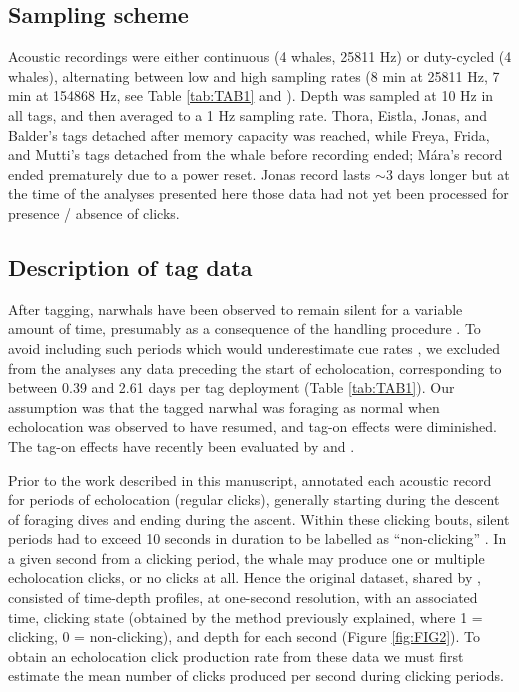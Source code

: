 \documentclass[preprint]{JASA}
\begin{document}
\subsection{\label{sec:2:3} Sampling scheme}


Acoustic recordings were either continuous (4 whales, 25811 Hz) or duty-cycled (4 whales), alternating between low and high sampling rates (8 min at 25811 Hz, 7 min at 154868 Hz, see Table \ref{tab:TAB1} and \citet{blackwell2018}). Depth was sampled at 10 Hz in all tags, and then averaged to a 1 Hz sampling rate. Thora, Eistla, Jonas, and Balder’s tags detached after memory capacity was reached, while Freya, Frida, and Mutti’s tags detached  from the whale before recording ended; Mára’s record ended prematurely due to a power reset. Jonas record lasts $\sim$3 days longer but at the time of the analyses presented here those data had not yet been processed for presence / absence of clicks.

\subsection{\label{sec:2:4} Description of tag data}

After tagging, narwhals have been observed to remain silent for a variable amount of time, presumably as a consequence of the handling procedure \citep{blackwell2018}. To avoid including such periods which would underestimate cue rates \citep[e.g.][]{Shuert_2021}, we excluded from the analyses any data preceding the start of echolocation, corresponding to between 0.39 and 2.61 days per tag deployment (Table \ref{tab:TAB1}). Our assumption was that the tagged narwhal was foraging as normal when echolocation was observed to have resumed, and tag-on effects were diminished. The tag-on effects have recently been evaluated by \citet{Nielsen2023} and \citet{Shuert_2021}.

Prior to the work described in this manuscript, \citet{blackwell2018} annotated each acoustic record for periods of echolocation (regular clicks), generally starting during the descent of foraging dives and ending during the ascent. Within these clicking bouts, silent periods had to exceed 10 seconds in duration to be labelled as “non-clicking” \citep{blackwell2018}. In a given second from a clicking period, the whale may produce one or multiple echolocation  clicks, or no clicks at all. Hence the original dataset, shared by \citet{blackwell2018}, consisted of time-depth profiles, at one-second resolution, with an associated time, clicking state (obtained by the method previously explained, where 1 = clicking, 0 = non-clicking), and depth for each second (Figure \ref{fig:FIG2}). To obtain an echolocation click production rate from these data we must first estimate the mean number of clicks produced per second during clicking periods. 
\end{document}
